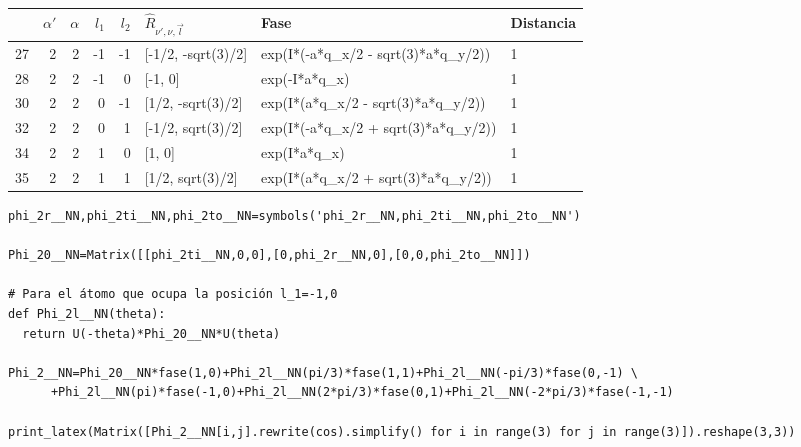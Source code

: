 \documentclass[12pt,a4paper]{article}
\begin{document}
\begin{tabular}{lrrrrlll}
\toprule
{} &  $\alpha\prime$ &  $\alpha$ &  $l_1$ &  $l_2$ & $\hat R_{\nu\prime,\nu,\vec l}$ &                                 Fase & Distancia \\
\midrule
27 &               2 &         2 &     -1 &     -1 &              [-1/2, -sqrt(3)/2] &  exp(I*(-a*q_x/2 - sqrt(3)*a*q_y/2)) &         1 \\
28 &               2 &         2 &     -1 &      0 &                         [-1, 0] &                        exp(-I*a*q_x) &         1 \\
30 &               2 &         2 &      0 &     -1 &               [1/2, -sqrt(3)/2] &   exp(I*(a*q_x/2 - sqrt(3)*a*q_y/2)) &         1 \\
32 &               2 &         2 &      0 &      1 &               [-1/2, sqrt(3)/2] &  exp(I*(-a*q_x/2 + sqrt(3)*a*q_y/2)) &         1 \\
34 &               2 &         2 &      1 &      0 &                          [1, 0] &                         exp(I*a*q_x) &         1 \\
35 &               2 &         2 &      1 &      1 &                [1/2, sqrt(3)/2] &   exp(I*(a*q_x/2 + sqrt(3)*a*q_y/2)) &         1 \\
\bottomrule
\end{tabular}


\begin{verbatim}
phi_2r__NN,phi_2ti__NN,phi_2to__NN=symbols('phi_2r__NN,phi_2ti__NN,phi_2to__NN')

Phi_20__NN=Matrix([[phi_2ti__NN,0,0],[0,phi_2r__NN,0],[0,0,phi_2to__NN]])

# Para el átomo que ocupa la posición l_1=-1,0
def Phi_2l__NN(theta):
  return U(-theta)*Phi_20__NN*U(theta)

Phi_2__NN=Phi_20__NN*fase(1,0)+Phi_2l__NN(pi/3)*fase(1,1)+Phi_2l__NN(-pi/3)*fase(0,-1) \
      +Phi_2l__NN(pi)*fase(-1,0)+Phi_2l__NN(2*pi/3)*fase(0,1)+Phi_2l__NN(-2*pi/3)*fase(-1,-1)

print_latex(Matrix([Phi_2__NN[i,j].rewrite(cos).simplify() for i in range(3) for j in range(3)]).reshape(3,3))
\end{verbatim}
\end{document}
